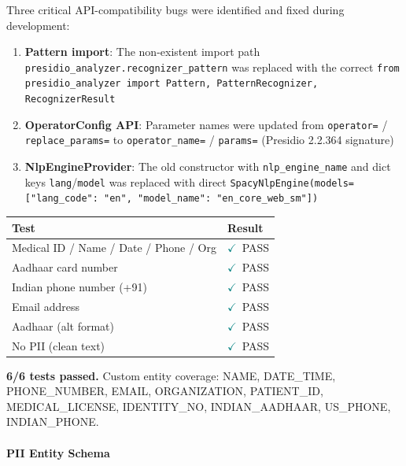 \documentclass[11pt,a4paper]{article}
\begin{document}
Three critical API-compatibility bugs were identified and fixed during development:

\begin{enumerate}[label=\textcolor{teal}{\textsf{!}}\ \arabic*., leftmargin=*]
\item \textbf{Pattern import}: The non-existent import path \texttt{presidio\_analyzer.recognizer\_pattern} was replaced with the correct \texttt{from presidio\_analyzer import Pattern, PatternRecognizer, RecognizerResult}
\item \textbf{OperatorConfig API}: Parameter names were updated from \texttt{operator=} / \texttt{replace\_params=} to \texttt{operator\_name=} / \texttt{params=} (Presidio 2.2.364 signature)
\item \textbf{NlpEngineProvider}: The old constructor with \texttt{nlp\_engine\_name} and dict keys \texttt{lang}/\texttt{model} was replaced with direct \texttt{SpacyNlpEngine(models=[{"lang\_code": "en", "model\_name": "en\_core\_web\_sm"}])}
\end{enumerate}

\begin{tcolorbox}[successBox={PII Self-Test Results}, colback=white]
\centering
\begin{tabular}{ll}
\toprule
\textbf{Test} & \textbf{Result} \\
\midrule
Medical ID / Name / Date / Phone / Org & \textcolor{teal}{$\checkmark$}\ PASS \\
Aadhaar card number & \textcolor{teal}{$\checkmark$}\ PASS \\
Indian phone number (+91) & \textcolor{teal}{$\checkmark$}\ PASS \\
Email address & \textcolor{teal}{$\checkmark$}\ PASS \\
Aadhaar (alt format) & \textcolor{teal}{$\checkmark$}\ PASS \\
No PII (clean text) & \textcolor{teal}{$\checkmark$}\ PASS \\
\bottomrule
\end{tabular}

\vspace{0.5em}

\textbf{6/6 tests passed.} Custom entity coverage: NAME, DATE\_TIME, PHONE\_NUMBER, EMAIL, ORGANIZATION, PATIENT\_ID, MEDICAL\_LICENSE, IDENTITY\_NO, INDIAN\_AADHAAR, US\_PHONE, INDIAN\_PHONE.
\end{tcolorbox}

\paragraph{PII Entity Schema}
\end{document}
